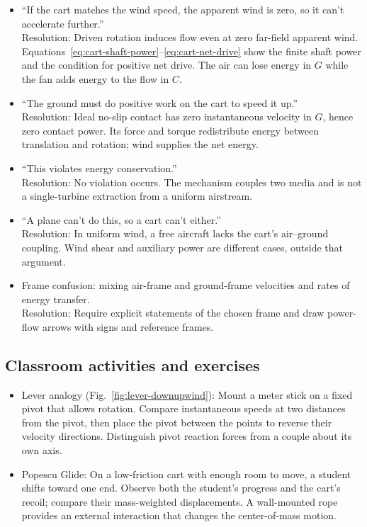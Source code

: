 \documentclass[reprint,aps,pra,longbibliography]{revtex4-2}
\begin{document}
\begin{itemize}
\item ``If the cart matches the wind speed, the apparent wind is zero, so it can't accelerate further.''
\\Resolution: Driven rotation induces flow even at zero far-field apparent wind. Equations~\eqref{eq:cart-shaft-power}--\eqref{eq:cart-net-drive} show the finite shaft power and the condition for positive net drive. The air can lose energy in \(G\) while the fan adds energy to the flow in \(C\).

\item ``The ground must do positive work on the cart to speed it up.''
\\Resolution: Ideal no-slip contact has zero instantaneous velocity in \(G\), hence zero contact power. Its force and torque redistribute energy between translation and rotation; wind supplies the net energy.

\item ``This violates energy conservation.''
\\Resolution: No violation occurs. The mechanism couples two media and is not a single-turbine extraction from a uniform airstream.

\item ``A plane can't do this, so a cart can't either.''
\\Resolution: In uniform wind, a free aircraft lacks the cart's air--ground coupling. Wind shear and auxiliary power are different cases, outside that argument.

\item Frame confusion: mixing air-frame and ground-frame velocities and rates of energy transfer.
\\Resolution: Require explicit statements of the chosen frame and draw power-flow arrows with signs and reference frames.
\end{itemize}

\subsection{Classroom activities and exercises}

\begin{itemize}
\item Lever analogy (Fig.~\ref{fig:lever-downupwind}): Mount a meter stick on a fixed pivot that allows rotation. Compare instantaneous speeds at two distances from the pivot, then place the pivot between the points to reverse their velocity directions. Distinguish pivot reaction forces from a couple about its own axis.
\item Popescu Glide: On a low-friction cart with enough room to move, a student shifts toward one end. Observe both the student's progress and the cart's recoil; compare their mass-weighted displacements. A wall-mounted rope provides an external interaction that changes the center-of-mass motion.
\end{itemize}
\end{document}
